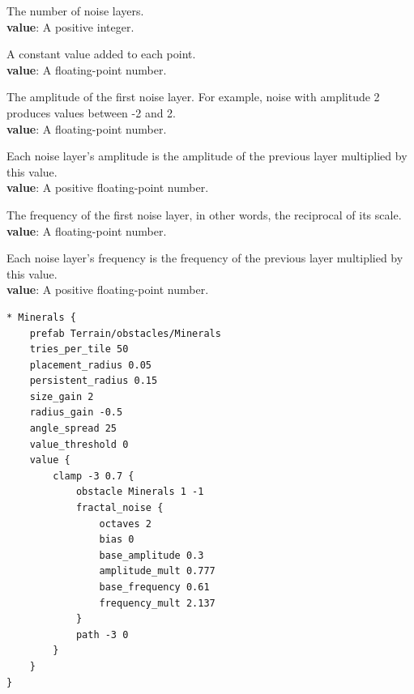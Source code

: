 The number of noise layers.\\
\textbf{value}: A positive integer.

A constant value added to each point.\\
\textbf{value}: A floating-point number.

The amplitude of the first noise layer.
For example, noise with amplitude 2 produces values between -2 and 2.\\
\textbf{value}: A floating-point number.

Each noise layer's amplitude is the amplitude of the previous layer multiplied by this value.\\
\textbf{value}: A positive floating-point number.

The frequency of the first noise layer, in other words, the reciprocal of its scale.\\
\textbf{value}: A floating-point number.

Each noise layer's frequency is the frequency of the previous layer multiplied by this value.\\
\textbf{value}: A positive floating-point number.

\begin{verbatim}
* Minerals {
    prefab Terrain/obstacles/Minerals
    tries_per_tile 50
    placement_radius 0.05
    persistent_radius 0.15
    size_gain 2
    radius_gain -0.5
    angle_spread 25
    value_threshold 0
    value {
        clamp -3 0.7 {
            obstacle Minerals 1 -1
            fractal_noise {
                octaves 2
                bias 0
                base_amplitude 0.3
                amplitude_mult 0.777
                base_frequency 0.61
                frequency_mult 2.137
            }
            path -3 0
        }
    }
}
\end{verbatim}
